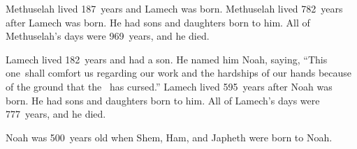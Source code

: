\begin{inparaenum}
   Methuselah lived 187~years and Lamech was born.%
   Methuselah lived 782~years after Lamech was born. He had sons and daughters born to him.%
   All of Methuselah's days were 969~years, and he died.%

   Lamech lived 182~years and had a son.%
   He named him Noah, saying, ``This one\understood\ shall comfort us regarding our work and the hardships of our hands because of the ground that the \lord\ has cursed.''%
   Lamech lived 595~years after Noah was born. He had sons and daughters born to him.%
   All of Lamech's days were 777~years, and he died.%

   Noah was 500~years old when Shem, Ham, and Japheth were born to Noah.%
\end{inparaenum}

